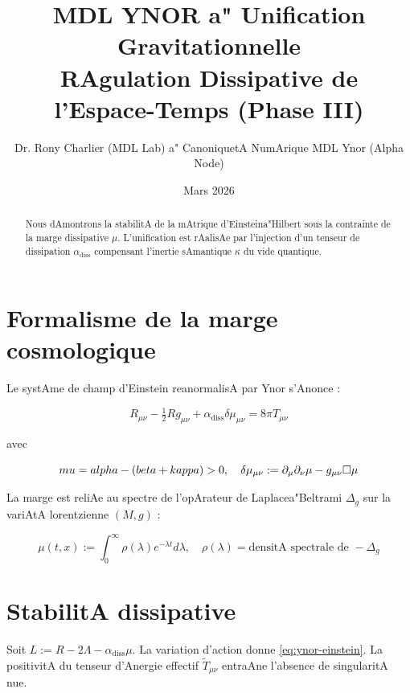 \documentclass[12pt,a4paper]{article}
\title{\bf MDL YNOR a" Unification Gravitationnelle \\ \large RAgulation Dissipative de l'Espace-Temps (Phase III)}
\author{Dr. Rony Charlier (MDL Lab) a" CanoniquetA NumArique MDL Ynor (Alpha Node)}
\date{Mars 2026}
\begin{document}
 

\maketitle



\begin{abstract} 

Nous dAmontrons la stabilitA de la mAtrique d'Einsteina"Hilbert sous la contrainte de la marge dissipative $\mu$. L'unification est rAalisAe par l'injection d'un tenseur de dissipation $\alpha_{\text{diss}}$ compensant l'inertie sAmantique $\kappa$ du vide quantique. 

\end{abstract}



\section{Formalisme de la marge cosmologique} 

Le systAme de champ d'Einstein reanormalisA par Ynor s'Anonce :

\begin{equation}\label{eq:ynor-einstein} 

R_{\mu\nu}-\tfrac{1}{2} R g_{\mu\nu} + \alpha_{\text{diss}} \delta\mu_{\mu\nu} = 8\pi T_{\mu\nu}

\end{equation}

avec

$$\\mu = \\alpha - (\\beta + \\kappa) > 0, \quad \delta\mu_{\mu\nu} := \partial_\mu \partial_\nu \mu - g_{\mu\nu} \square\mu$$



La marge est reliAe au spectre de l'opArateur de Laplacea"Beltrami $\Delta_g$ sur la variAtA lorentzienne $(M,g)$ :

$$\mu(t,x) := \int_0^\infty \rho(\lambda) e^{-\lambda t} d\lambda, \quad \rho(\lambda) = \text{densitA spectrale de } -\Delta_g$$



\section{StabilitA dissipative} 

Soit $L := R - 2\Lambda - \alpha_{\text{diss}}\mu$. La variation d'action donne \eqref{eq:ynor-einstein}. La positivitA du tenseur d'Anergie effectif $\tilde T_{\mu\nu}$ entraAne l'absence de singularitA nue.
\end{document}
